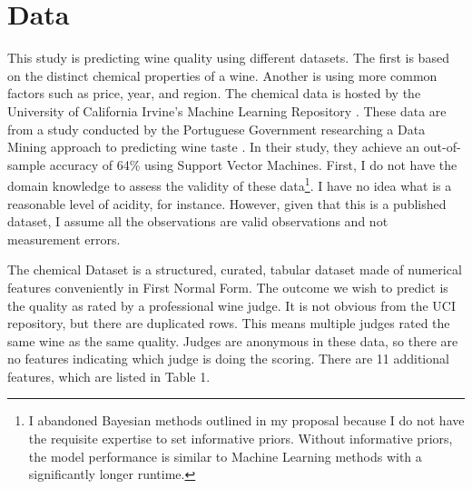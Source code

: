 \documentclass[16pt,twocolumn,letterpaper,titlepage]{article}
\begin{document}
\section{Data}

This study is predicting wine quality using different datasets. The first is based on the distinct chemical properties of a wine. Another is using more common factors such as price, year, and region. The chemical data is hosted by the University of California Irvine's Machine Learning Repository \cite{Lichman:2013}. These data are from a study conducted by the Portuguese Government researching a Data Mining approach to predicting wine taste \cite{Cortez}. In their study, they achieve an out-of-sample accuracy of 64\% using Support Vector Machines. First, I do not have the domain knowledge to assess the validity of these data\footnote{I abandoned Bayesian methods outlined in my proposal because I do not have the requisite expertise to set informative priors. Without informative priors, the model performance is similar to Machine Learning methods with a significantly longer runtime.}. I have no idea what is a reasonable level of acidity, for instance. However, given that this is a published dataset, I assume all the observations are valid observations and not measurement errors.

The chemical Dataset is a structured, curated, tabular dataset made of numerical features conveniently in First Normal Form. The outcome we wish to predict is the quality as rated by a professional wine judge. It is not obvious from the UCI repository, but there are duplicated rows. This means multiple judges rated the same wine as the same quality. Judges are anonymous in these data, so there are no features indicating which judge is doing the scoring. There are 11 additional features, which are listed in Table 1.  
\end{document}
